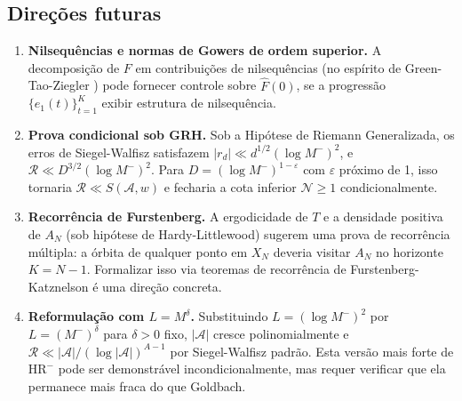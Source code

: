 \documentclass[12pt,a4paper]{article}
\theoremstyle{definition}
\newcommand{\HRm}{\mathrm{HR}^{-}}
\begin{document}
	\subsection{Direções futuras}
	
	\begin{enumerate}
		\item \textbf{Nilsequências e normas de Gowers de ordem superior.} A
		decomposição de $F$ em contribuições de nilsequências (no espírito de
		Green-Tao-Ziegler \cite{greentao}) pode fornecer controle sobre
		$\widehat{F}(0)$, se a progressão $\{e_1(t)\}_{t=1}^K$ exibir
		estrutura de nilsequência.
		
		\item \textbf{Prova condicional sob GRH.} Sob a Hipótese de Riemann
		Generalizada, os erros de Siegel-Walfisz satisfazem
		$|r_d| \ll d^{1/2}(\log M^-)^2$, e $\mathcal{R} \ll
		D^{3/2}(\log M^-)^2$. Para $D = (\log M^-)^{1-\varepsilon}$ com
		$\varepsilon$ próximo de 1, isso tornaria $\mathcal{R} \ll
		S(\mathcal{A},w)$ e fecharia a cota inferior $\mathcal{N} \geq 1$
		condicionalmente.
		
		\item \textbf{Recorrência de Furstenberg.} A ergodicidade de $T$ e
		a densidade positiva de $A_N$ (sob hipótese de Hardy-Littlewood)
		sugerem uma prova de recorrência múltipla: a órbita de qualquer ponto
		em $X_N$ deveria visitar $A_N$ no horizonte $K = N-1$. Formalizar
		isso via teoremas de recorrência de Furstenberg-Katznelson é uma
		direção concreta.
		
		\item \textbf{Reformulação com $L = M^\delta$.} Substituindo
		$L = (\log M^-)^2$ por $L = (M^-)^\delta$ para $\delta > 0$ fixo,
		$|\mathcal{A}|$ cresce polinomialmente e $\mathcal{R} \ll
		|\mathcal{A}|/(\log |\mathcal{A}|)^{A-1}$ por Siegel-Walfisz padrão.
		Esta versão mais forte de $\HRm$ pode ser demonstrável
		incondicionalmente, mas requer verificar que ela permanece mais fraca
		do que Goldbach.
	\end{enumerate}
	
\end{document}
